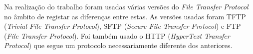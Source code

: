 

Na realização do trabalho foram usadas várias versões do \emph{File Transfer Protocol} no âmbito de registar as diferenças entre estas. As versões usadas foram TFTP (\emph{Trivial File Transfer Protocol}), SFTP (\emph{Secure File Transfer Protocol}) e FTP (\emph{File Transfer Protocol}). Foi também usado o HTTP (\emph{HyperText Transfer Protocol}) que segue um protocolo necessariamente diferente dos anteriores.

